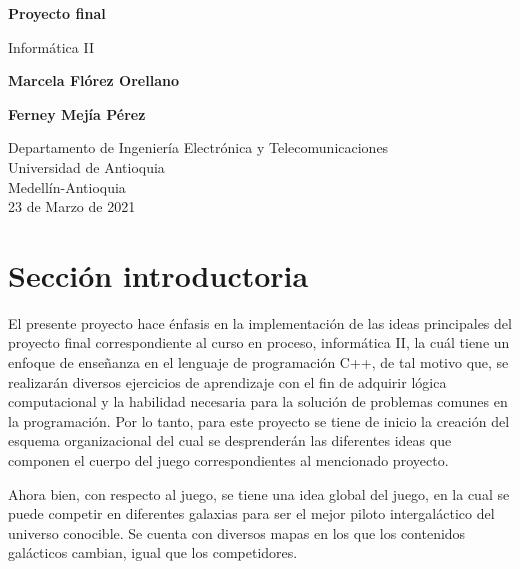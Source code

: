 \documentclass{article}
\begin{document}
\begin{titlepage}
    \begin{center}
        \vspace*{1cm}
            
        \Huge
        \textbf{Proyecto final}
            
        \vspace{0.5cm}
        \LARGE
        Informática II
            
            
        \vspace{1.5cm}
        
        \textbf{Marcela Flórez Orellano} 
        
        \vspace{0.3cm}
        \LARGE
        
        \textbf{Ferney Mejía Pérez}
            
        \vfill
            
        \vspace{0.8cm}
            
        \Large
        Departamento de Ingeniería Electrónica y Telecomunicaciones\\
        Universidad de Antioquia\\
        Medellín-Antioquia\\
        23 de Marzo de 2021
         
            
    \end{center}
\end{titlepage}


\tableofcontents
\newpage


\section{Sección introductoria}\label{intro}
El presente proyecto hace énfasis en la implementación de las ideas principales del proyecto final correspondiente al curso en proceso, informática II, la cuál tiene un enfoque de enseñanza en el lenguaje de programación C++, de tal motivo que, se realizarán diversos ejercicios de aprendizaje con el fin de adquirir lógica computacional y la habilidad necesaria para la solución de problemas comunes en la programación. Por lo tanto, para este proyecto se tiene de inicio la creación del esquema organizacional del cual se desprenderán las diferentes ideas que componen el cuerpo del juego correspondientes al mencionado proyecto.

Ahora bien, con respecto al juego, se tiene una idea global del juego, en la cual se puede competir en diferentes galaxias para ser el mejor piloto intergaláctico del universo conocible. Se cuenta con diversos mapas en los que los contenidos galácticos cambian, igual que los competidores. 
\end{document}
